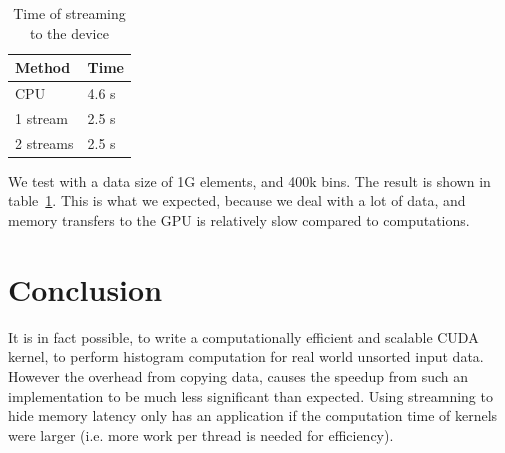 \documentclass[12pt, a4paper, hidelinks]{article}
\begin{document}
\begin{table}[htpb]
    \centering
    \begin{tabular}{l l}
        Method & Time \\
        \hline
        CPU & 4.6 s \\
        1 stream  & 2.5 s \\
        2 streams & 2.5 s \\
        \hline
    \end{tabular}
    \caption{Time of streaming to the device}
    \label{tab:stream}
\end{table}

We test with a data size of 1G elements, and 400k bins. The result is shown in table~\ref{tab:stream}.
This is what we expected, because we deal with a lot of data, and memory transfers to the GPU is
relatively slow compared to computations.

\section{Conclusion}
It is in fact possible, to write a computationally efficient and scalable CUDA kernel,
to perform histogram computation for real world unsorted input data.
However the overhead from copying data,
causes the speedup from such an implementation to be much less significant than expected. Using streamning to hide memory latency only has an application if the computation time of kernels were larger (i.e. more work per thread is needed for efficiency).



\end{document}
